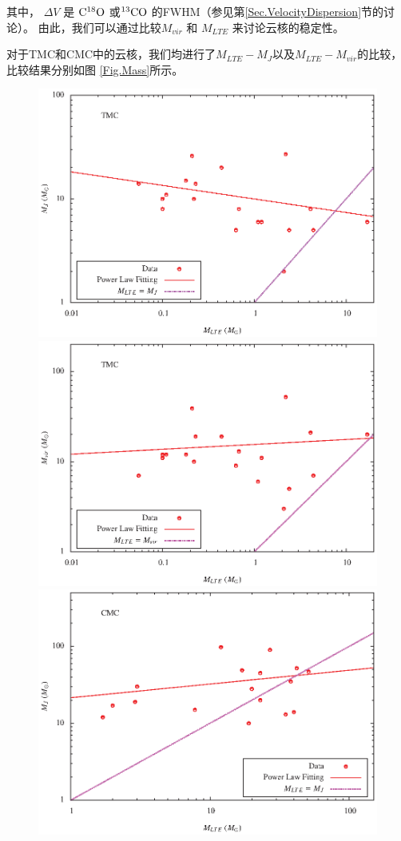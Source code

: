 \documentclass[UTF8, nocolorlinks]{pkuthss}
\newcommand{\cob}{$\rm ^{13}CO$ }
\newcommand{\coc}{$\rm C^{18}O$ }
\begin{document}
     	其中， $\Delta V $ 是 \coc 或\cob 的FWHM（参见第\ref{Sec.VelocityDispersion}节的讨论）。 由此，我们可以通过比较$M_{vir}$ 和 $M_{LTE}$ 来讨论云核的稳定性。

     	对于TMC和CMC中的云核，我们均进行了$M_{LTE}-M_{J}$以及$M_{LTE}-M_{vir}$的比较，比较结果分别如图 \ref{Fig.Mass}所示。

     	\begin{figure}[htbp]
			\includegraphics[totalheight=50mm]{img_plot/M_j_tmc.eps}
			\includegraphics[totalheight=50mm]{img_plot/M_vir_tmc.eps}\\
			\includegraphics[totalheight=50mm]{img_plot/M_j_cmc.eps}

\end{figure}
\end{document}
